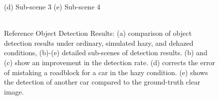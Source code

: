 \documentclass[lettersize,journal]{IEEEtran}
\begin{document}
\begin{figure}[pht]
    (d) Sub-scene 3\qquad\qquad\qquad\qquad\qquad\qquad\qquad\qquad\qquad\quad\; (e) Sub-scene 4\\

    \quad \\
    
    \caption{Reference Object Detection Results: (a) comparison of object detection results under ordinary, simulated hazy, and dehazed conditions, (b)-(e) detailed sub-scenes of detection results. (b) and (c) show an improvement in the detection rate. (d) corrects the error of mistaking a roadblock for a car in the hazy condition. (e) shows the detection of another car compared to the ground-truth clear image.}
    
    \label{object_detection}
    
\end{figure}
\end{document}
